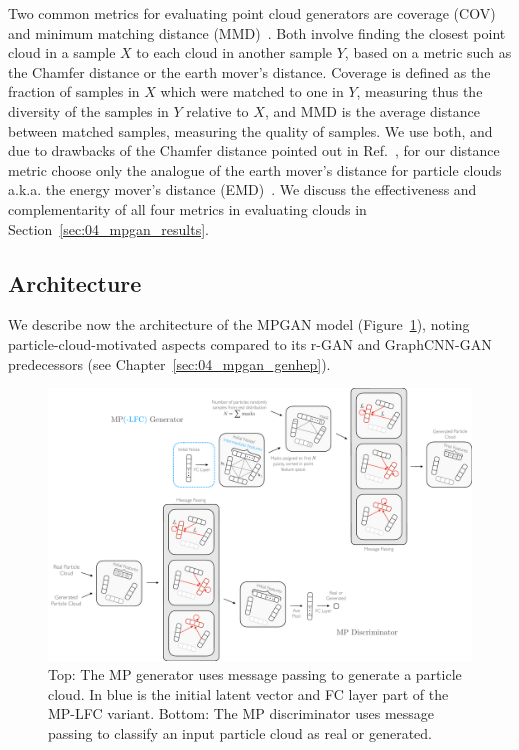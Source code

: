 Two common metrics for evaluating point cloud generators are coverage (COV) and minimum matching distance (MMD)~\cite{rgan}.
Both involve finding the closest point cloud in a sample $X$ to each cloud in another sample $Y$, based on a metric such as the Chamfer distance or the earth mover's distance.
Coverage is defined as the fraction of samples in $X$ which were matched to one in $Y$, measuring thus the diversity of the samples in $Y$ relative to $X$, and MMD is the average distance between matched samples, measuring the quality of samples.
We use both, and due to drawbacks of the Chamfer distance pointed out in Ref.~\cite{rgan}, for our distance metric choose only the analogue of the earth mover's distance for particle clouds a.k.a. the energy mover's distance (EMD)~\cite{Komiske:2019fks}.
We discuss the effectiveness and complementarity of all four metrics in evaluating clouds in Section~\ref{sec:04_mpgan_results}.


\subsection{Architecture}
\label{sec:04_mpgan_arch}

We describe now the architecture of the MPGAN model (Figure~\ref{fig:04_mpgan_arch}), noting particle-cloud-motivated aspects compared to its r-GAN and GraphCNN-GAN predecessors (see Chapter~\ref{sec:04_mpgan_genhep}).

\begin{figure}[t!]
    \centering
    \centerline{\includegraphics[width=\textwidth]{figures/04-ML4Sim/mpgan/mparch_wide.pdf}}
    \caption[Top: The MP generator uses message passing to generate a particle cloud.]{Top: The MP generator uses message passing to generate a particle cloud.
    In blue is the initial latent vector and FC layer part of the MP-LFC variant.
    Bottom: The MP discriminator uses message passing to classify an input particle cloud as real or generated.}
    \label{fig:04_mpgan_arch}
\end{figure}

